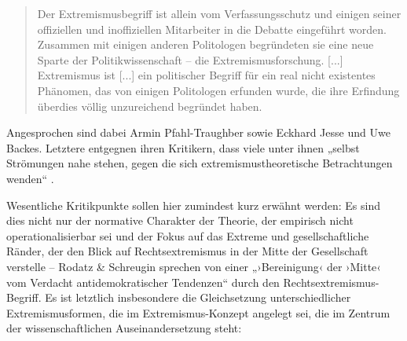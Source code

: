 \begin{quote}
Der Extremismusbegriff ist allein vom Verfassungsschutz und einigen seiner offiziellen und inoffiziellen Mitarbeiter in die Debatte eingeführt worden. Zusammen mit einigen anderen Politologen begründeten sie eine neue Sparte der Politikwissenschaft -- die Extremismusforschung. {[}...{]} Extremismus ist {[}...{]} ein politischer Begriff für ein real nicht existentes Phänomen, das von einigen Politologen erfunden wurde, die ihre Erfindung überdies völlig unzureichend begründet haben. \autocite[26-27]{wippermannDamonisierungDurchVergleich2009}
\end{quote}

Angesprochen sind dabei Armin Pfahl-Traughber sowie Eckhard Jesse und Uwe Backes. Letztere entgegnen ihren Kritikern, dass viele unter ihnen „selbst Strömungen nahe stehen, gegen die sich extremismustheoretische Betrachtungen wenden`` \autocite[182]{backesVergleichendeExtremismusforschung2005}.

Wesentliche Kritikpunkte sollen hier zumindest kurz erwähnt werden: Es sind dies nicht nur der normative Charakter der Theorie, der empirisch nicht operationalisierbar sei \autocite{zimmermannWissenschaftstheoretischeElementeKritik2010} und der Fokus auf das Extreme und gesellschaftliche Ränder, der den Blick auf Rechtsextremismus in der Mitte der Gesellschaft verstelle -- Rodatz \& Schreugin sprechen von einer „›Bereinigung‹ der ›Mitte‹ vom Verdacht antidemokratischer Tendenzen`` \autocite*[166]{rodatzIntegrationAlsExtremismuspraevention2011} durch den Rechtsextremismus-Begriff. Es ist letztlich insbesondere die Gleichsetzung unterschiedlicher Extremismusformen, die im Extremismus-Konzept angelegt sei, die im Zentrum der wissenschaftlichen Auseinandersetzung steht:

